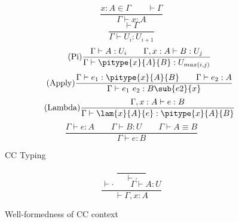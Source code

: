 \begin{figure}
	\begin{equation}
		\tag{Var}
		\frac
			{x : A \in \Gamma \qquad \vdash \Gamma}
			{\Gamma \vdash x : A}
	\end{equation} \hspace{0.5cm}
	\begin{equation}
		\tag{Universe}
		\frac
			{\vdash \Gamma}
			{\Gamma \vdash U_i : U_{i+1}}
	\end{equation} \hspace{0.5cm}
	\begin{equation}
		\tag{Pi}
		\frac
			{\Gamma \vdash A : U_i \qquad \Gamma, x : A \vdash B : U_j
			}
			{\Gamma \vdash \pitype{x}{A}{B} : U_{max(i, j)}}
	\end{equation} \hspace{0.5cm}
	\begin{equation}
		\tag{Apply}
		\frac
			{\Gamma \vdash e_1 : \pitype{x}{A}{B} \qquad \Gamma \vdash e_2 : A}
			{\Gamma \vdash e_1 \ e_2 : B\sub{e2}{x}}
	\end{equation} \hspace{0.5cm}
	\begin{equation}
		\tag{Lambda}
		\frac
			{ \Gamma, x : A \vdash e : B}
			{ \Gamma \vdash \lam{x}{A}{e} : \pitype{x}{A}{B}}
	\end{equation} \hspace{0.5cm}
	\begin{equation}
		\tag{Equv}
		\frac
			{\Gamma \vdash e : A \qquad \Gamma \vdash B : U \qquad \Gamma \vdash A \equiv B}
			{\Gamma \vdash e : B}
	\end{equation}
	\caption{CC Typing}
    \label{fig:cc typing}
\end{figure}

\begin{figure}
	\begin{equation}
		\tag{WF-Empty}
		\frac{ }{\quad \vdash {\cdot} \quad}
	\end{equation} \hspace{0.5cm}
	\begin{equation}
		\tag{WF-Con}
		\frac
			{\vdash \cdot \qquad \Gamma \vdash A : U}
			{\vdash \Gamma , x : A}
	\end{equation}
	\caption{Well-formedness of CC context}
    \label{fig:cc context}
\end{figure}

